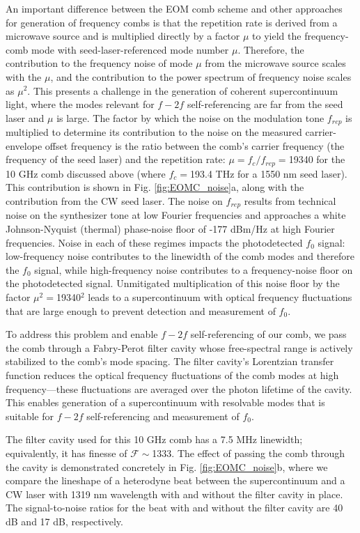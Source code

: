 An important difference between the EOM comb scheme and other approaches for generation of frequency combs is that the repetition rate is derived from a microwave source and is multiplied directly by a factor $\mu$ to yield the frequency-comb mode with seed-laser-referenced mode number $\mu$. Therefore, the contribution to the frequency noise of mode $\mu$ from the microwave source scales with the $\mu$, and the contribution to the power spectrum of frequency noise scales as $\mu^2$. This presents a challenge in the generation of coherent supercontinuum light, where the modes relevant for $f-2f$ self-referencing are far from the seed laser and $\mu$ is large. The factor by which the noise on the modulation tone $f_{rep}$ is multiplied to determine its contribution to the noise on the measured carrier-envelope offset frequency is the ratio between the comb's carrier frequency (the frequency of the seed laser) and the repetition rate: $\mu=f_c/f_{rep}=$19340 for the 10 GHz comb discussed above (where $f_c=$193.4 THz for a 1550 nm seed laser). This contribution is shown in Fig. \ref{fig:EOMC_noise}a, along with the contribution from the CW seed laser. The noise on $f_{rep}$ results from technical noise on the synthesizer tone at low Fourier frequencies and approaches a white Johnson-Nyquist (thermal) phase-noise floor of -177 dBm/Hz at high Fourier frequencies. Noise in each of these regimes impacts the photodetected $f_0$ signal: low-frequency noise contributes to the linewidth of the comb modes and therefore the $f_0$ signal, while high-frequency noise contributes to a frequency-noise floor on the photodetected signal\cite{DiDomenico2010}. Unmitigated multiplication of this noise floor by the factor $\mu^2=$19340$^2$ leads to a supercontinuum with optical frequency fluctuations that are large enough to prevent detection and measurement of $f_0$. 

To address this problem and enable $f-2f$ self-referencing of our comb, we pass the comb through a Fabry-Perot filter cavity whose free-spectral range is actively stabilized to the comb's mode spacing. The filter cavity's Lorentzian transfer function reduces the optical frequency fluctuations of the comb modes at high frequency---these fluctuations are averaged over the photon lifetime of the cavity. This enables generation of a supercontinuum with resolvable modes that is suitable for $f-2f$ self-referencing and measurement of $f_0$. 

The filter cavity used for this 10 GHz comb has a 7.5 MHz linewidth; equivalently, it has finesse of $\mathcal{F}\sim$1333. The effect of passing the comb through the cavity is demonstrated concretely in Fig. \ref{fig:EOMC_noise}b, where we compare the lineshape of a heterodyne beat between the supercontinuum and a CW laser with 1319 nm wavelength with and without the filter cavity in place. The signal-to-noise ratios for the beat with and without the filter cavity are 40 dB and 17 dB, respectively.



